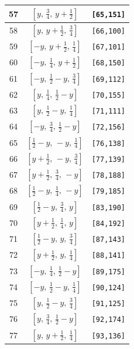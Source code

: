 \documentclass[fleqn,8pt]{jsarticle}
\begin{document}
\begin{longtable}{ccc}
57 & $\left[ y,\, \frac{3}{4},\, y + \frac{1}{2} \right]$ & {\tt [65,151]} \\ \hline
58 & $\left[ y,\, y + \frac{1}{2},\, \frac{3}{4} \right]$ & {\tt [66,100]} \\ \hline
59 & $\left[ - y,\, y + \frac{1}{2},\, \frac{1}{4} \right]$ & {\tt [67,101]} \\ \hline
60 & $\left[ - y,\, \frac{1}{4},\, y + \frac{1}{2} \right]$ & {\tt [68,150]} \\ \hline
61 & $\left[ - y,\, \frac{1}{2} - y,\, \frac{3}{4} \right]$ & {\tt [69,112]} \\ \hline
62 & $\left[ y,\, \frac{1}{4},\, \frac{1}{2} - y \right]$ & {\tt [70,155]} \\ \hline
63 & $\left[ y,\, \frac{1}{2} - y,\, \frac{1}{4} \right]$ & {\tt [71,111]} \\ \hline
64 & $\left[ - y,\, \frac{3}{4},\, \frac{1}{2} - y \right]$ & {\tt [72,156]} \\ \hline
65 & $\left[ \frac{1}{2} - y,\, - y,\, \frac{1}{4} \right]$ & {\tt [76,138]} \\ \hline
66 & $\left[ y + \frac{1}{2},\, - y,\, \frac{3}{4} \right]$ & {\tt [77,139]} \\ \hline
67 & $\left[ y + \frac{1}{2},\, \frac{3}{4},\, - y \right]$ & {\tt [78,188]} \\ \hline
68 & $\left[ \frac{1}{2} - y,\, \frac{1}{4},\, - y \right]$ & {\tt [79,185]} \\ \hline
69 & $\left[ \frac{1}{2} - y,\, \frac{3}{4},\, y \right]$ & {\tt [83,190]} \\ \hline
70 & $\left[ y + \frac{1}{2},\, \frac{1}{4},\, y \right]$ & {\tt [84,192]} \\ \hline
71 & $\left[ \frac{1}{2} - y,\, y,\, \frac{3}{4} \right]$ & {\tt [87,143]} \\ \hline
72 & $\left[ y + \frac{1}{2},\, y,\, \frac{1}{4} \right]$ & {\tt [88,141]} \\ \hline
73 & $\left[ - y,\, \frac{1}{4},\, \frac{1}{2} - y \right]$ & {\tt [89,175]} \\ \hline
74 & $\left[ - y,\, \frac{1}{2} - y,\, \frac{1}{4} \right]$ & {\tt [90,124]} \\ \hline
75 & $\left[ y,\, \frac{1}{2} - y,\, \frac{3}{4} \right]$ & {\tt [91,125]} \\ \hline
76 & $\left[ y,\, \frac{3}{4},\, \frac{1}{2} - y \right]$ & {\tt [92,174]} \\ \hline
77 & $\left[ y,\, y + \frac{1}{2},\, \frac{1}{4} \right]$ & {\tt [93,136]} \\ \hline

\end{longtable}
\end{document}
